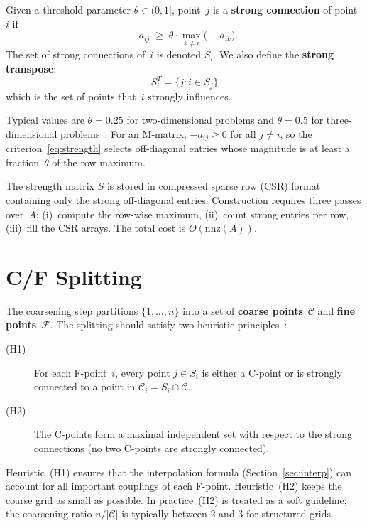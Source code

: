 \documentclass[11pt]{article}
\newcommand{\CC}{\mathcal{C}}
\newcommand{\FF}{\mathcal{F}}
\begin{document}
\begin{definition}
  Given a threshold parameter $\theta \in (0,1]$, point~$j$ is a
  \textbf{strong connection} of point~$i$ if
  \begin{equation}
    \label{eq:strength}
    -a_{ij} \;\ge\; \theta \cdot \max_{k \ne i}\bigl(-a_{ik}\bigr).
  \end{equation}
  The set of strong connections of~$i$ is denoted $S_i$.  We also
  define the \textbf{strong transpose}:
  \[
    S_i^T = \{j : i \in S_j\}
  \]
  which is the set of points that~$i$ strongly influences.
\end{definition}

Typical values are $\theta = 0.25$ for two-dimensional problems and
$\theta = 0.5$ for three-dimensional problems~\cite{Stuben2001}.  For
an M-matrix, $-a_{ij} \ge 0$ for all $j \ne i$, so the
criterion~\eqref{eq:strength} selects off-diagonal entries whose
magnitude is at least a fraction~$\theta$ of the row maximum.

The strength matrix $S$ is stored in compressed sparse row (CSR) format
containing only the strong off-diagonal entries.  Construction requires
three passes over~$A$: (i)~compute the row-wise maximum, (ii)~count
strong entries per row, (iii)~fill the CSR arrays.  The total cost is
$O(\mathrm{nnz}(A))$.

\section{C/F Splitting}
\label{sec:coarsening}

The coarsening step partitions $\{1, \ldots, n\}$ into a set of
\textbf{coarse points}~$\CC$ and \textbf{fine points}~$\FF$.  The
splitting should satisfy two heuristic principles~\cite{RS1987}:

\begin{description}
  \item[(H1)] For each F-point~$i$, every point $j \in S_i$ is either
    a C-point or is strongly connected to a point in $\CC_i = S_i \cap \CC$.
  \item[(H2)] The C-points form a maximal independent set with respect
    to the strong connections (no two C-points are strongly connected).
\end{description}

Heuristic~(H1) ensures that the interpolation formula (Section~\ref{sec:interp})
can account for all important couplings of each F-point.
Heuristic~(H2) keeps the coarse grid as small as possible.
In practice~(H2) is treated as a soft guideline; the coarsening ratio
$n / |\CC|$ is typically between 2 and 3 for structured grids.
\end{document}

